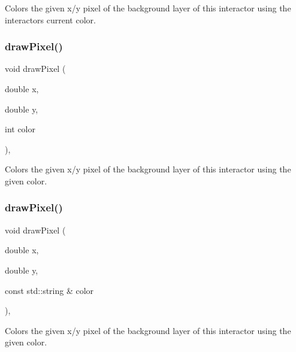 Colors the given x/y pixel of the background layer of this interactor using the interactor\textquotesingle{}s current color. 

\mbox{\label{classGDrawingSurface_a3a64eb6383e601be8438e9c71643c432}} 
\subsubsection{\texorpdfstring{draw\+Pixel()}{drawPixel()}\hspace{0.1cm}{\footnotesize\ttfamily [2/3]}}
{\footnotesize\ttfamily void draw\+Pixel (\begin{DoxyParamCaption}\item[{double}]{x,  }\item[{double}]{y,  }\item[{int}]{color }\end{DoxyParamCaption})\hspace{0.3cm}{\ttfamily [virtual]}, {\ttfamily [inherited]}}



Colors the given x/y pixel of the background layer of this interactor using the given color. 

\mbox{\label{classGDrawingSurface_a20abc26a94b7eb310e34abf668e0f5f4}} 
\subsubsection{\texorpdfstring{draw\+Pixel()}{drawPixel()}\hspace{0.1cm}{\footnotesize\ttfamily [3/3]}}
{\footnotesize\ttfamily void draw\+Pixel (\begin{DoxyParamCaption}\item[{double}]{x,  }\item[{double}]{y,  }\item[{const std\+::string \&}]{color }\end{DoxyParamCaption})\hspace{0.3cm}{\ttfamily [virtual]}, {\ttfamily [inherited]}}



Colors the given x/y pixel of the background layer of this interactor using the given color. 

